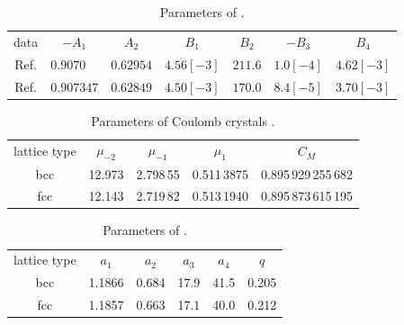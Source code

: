 
\begin{table}
\caption{Parameters of \protect{}.\protect{} 
}
\label{tab-ii}
\begin{tabular}{ccccccc}
data & $-A_1$ & $A_2$ & $B_1$ & $B_2$ & $-B_3$ & $B_4$ \\
\noalign{\smallskip}\hline\noalign{\smallskip}
 Ref.\cite{DWS} & $0.9070\phantom{00}$ & $0.62954$ 
       & $4.56[-3]$ & $211.6$ & $1.0[-4]$ & $4.62[-3]$ \\
 Ref.\cite{Caillol} & $0.907347$ & $0.62849$ 
       & $4.50[-3]$ & $170.0$ & $8.4[-5]$ & $3.70[-3]$ \\
\end{tabular}
\end{table}

\begin{table}
\caption{Parameters of Coulomb crystals \protect\cite{Baiko}.}
\label{tab-lattice}
\begin{tabular}{ccccc}
  lattice type & $\mu_{-2}$ & $\mu_{-1}$ & $\mu_1$ & $C_M$ \\
\noalign{\smallskip}
\hline
\noalign{\smallskip}
 bcc & 12.973 & 2.798\,55 & 0.511\,3875 & 0.895\,929\,255\,682 \\
 fcc & 12.143 & 2.719\,82 & 0.513\,1940 & 0.895\,873\,615\,195 \\
\end{tabular}
\end{table}

\begin{table}
\caption{Parameters of \protect{}.}
\label{tab2}
\begin{tabular}{cccccc}
  lattice type & $a_1$ & $a_2$ & $a_3$ & $a_4$ & $q$ \\
\noalign{\smallskip}
\hline
\noalign{\smallskip}
 bcc & 1.1866 & 0.684 & 17.9 & 41.5 & 0.205 \\
 fcc & 1.1857 & 0.663 & 17.1 & 40.0 & 0.212 \\
\end{tabular}
\end{table}


